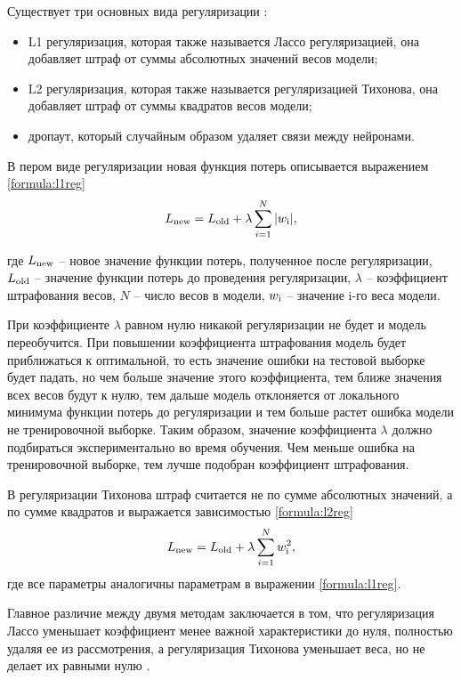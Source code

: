 Существует три основных вида регуляризации \cite{regulisation}:
\begin{itemize}
	\item L1 регуляризация, которая также называется Лассо регуляризацией, она добавляет штраф от суммы абсолютных значений весов модели;
	\item L2 регуляризация, которая также называется регуляризацией Тихонова, она добавляет штраф от суммы квадратов весов модели;
	\item дропаут, который случайным образом удаляет связи между нейронами.
\end{itemize}

В пером виде регуляризации новая функция потерь описывается выражением \ref{formula:l1reg}
\begin{equation}\label{formula:l1reg}
L_{\rm{new}} = L_{\rm{old}} + \lambda\sum\limits_{i=1}^{N}|w_{\rm{i}}|,
\end{equation}

где $L_{\rm{new}}$ -- новое значение функции потерь, полученное после регуляризации, $L_{\rm{old}}$ -- значение функции потерь до проведения регуляризации, $\lambda$ -- коэффициент штрафования весов, $N$ -- число весов в модели, $w_{\rm{i}}$ -- значение i-го веса модели.

При коэффициенте $\lambda$ равном нулю никакой регуляризации не будет и модель переобучится. При повышении коэффициента штрафования модель будет приближаться к оптимальной, то есть значение ошибки на тестовой выборке будет падать, но чем больше значение этого коэффициента, тем ближе значения всех весов будут к нулю, тем дальше модель отклоняется от локального минимума функции потерь до регуляризации и тем больше растет ошибка модели не тренировочной выборке. Таким образом, значение коэффициента $\lambda$ должно подбираться экспериментально во время обучения. Чем меньше ошибка на тренировочной выборке, тем лучше подобран коэффициент штрафования.

В регуляризации Тихонова штраф считается не по сумме абсолютных значений, а по сумме квадратов и выражается зависимостью \ref{formula:l2reg}
\begin{equation}\label{formula:l2reg}
L_{\rm{new}} = L_{\rm{old}} + \lambda\sum\limits_{i=1}^{N}w_{\rm{i}}^2,
\end{equation}
где все параметры аналогичны параметрам в выражении \ref{formula:l1reg}.

Главное различие между двумя методам заключается в том, что регуляризация Лассо уменьшает коэффициент менее важной характеристики до нуля, полностью удаляя ее из рассмотрения, а регуляризация Тихонова уменьшает веса, но не делает их равными нулю \cite{regulisation}.

